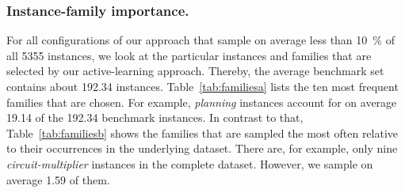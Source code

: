 \documentclass[runningheads]{llncs}
\begin{document}
\subsubsection{Instance-family importance.}
For all configurations of our approach that sample on average less than \SI{10}{\%} of all 5355 instances, we look at the particular instances and families that are selected by our active-learning approach.
Thereby, the average benchmark set contains about \SI{192.34}{} instances.
Table~\ref{tab:familiesa} lists the ten most frequent families that are chosen.
For example, \emph{planning} instances account for on average \SI{19.14}{} of the \SI{192.34}{} benchmark instances.
In contrast to that, Table~\ref{tab:familiesb} shows the families that are sampled the most often relative to their occurrences in the underlying dataset.
There are, for example, only nine \emph{circuit-multiplier} instances in the complete dataset.
However, we sample on average \SI{1.59}{} of them.

\end{document}
